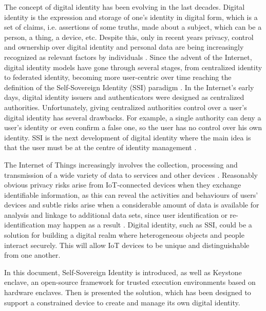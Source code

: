 
The concept of digital identity has been evolving in the last decades. Digital identity is the expression and storage of one's identity in digital form, which is a set of claims, i.e. assertions of some truths, made about a subject, which can be a person, a thing, a device, etc. Despite this, only in recent years privacy, control and ownership over digital identity and personal data are being increasingly recognized as relevant factors by individuals \cite{TheLawsOfIdentity}. 
Since the advent of the Internet, digital identity models have gone through several stages, from centralized identity to federated identity, becoming more user-centric over time reaching the definition of the Self-Sovereign Identity (SSI) paradigm \cite{ThePathToSSI}.
In the Internet's early days, digital identity issuers and authenticators were designed as centralized authorities. Unfortunately, giving centralized authorities control over a user's digital identity has several drawbacks. For example, a single authority can deny a user's identity or even confirm a false one, so the user has no control over his own identity. SSI is the next development of digital identity where the main idea is that the user must be at the centre of identity management \cite{ThePathToSSI}.


The Internet of Things increasingly involves the collection, processing and transmission of a wide variety of data to services and other devices \cite{wilson2018digital}. Reasonably obvious privacy risks arise from IoT-connected devices when they exchange identifiable information, as this can reveal the activities and behaviours of users' devices and subtle risks arise when a considerable amount of data is available for analysis and linkage to additional data sets, since user identification or re-identification may happen as a result \cite{wilson2018digital}. Digital identity, such as SSI, could be a solution for building a digital realm where heterogeneous objects and people interact securely. This will allow IoT devices to be unique and distinguishable from one another.


In this document, Self-Sovereign Identity is introduced, as well as Keystone enclave, an open-source framework for trusted execution environments based on hardware enclaves. Then is presented the solution, which has been designed to support a constrained device to create and manage its own digital identity. 


